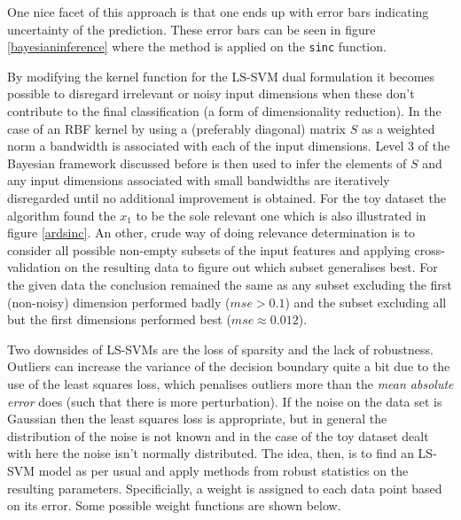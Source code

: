 One nice facet of this approach is that one ends up with error bars indicating uncertainty of the prediction. These error bars can be seen in figure \ref{bayesianinference} where the method is applied on the \texttt{sinc} function.


By modifying the kernel function for the LS-SVM dual formulation it becomes possible to disregard irrelevant or noisy input dimensions when these don't contribute to the final classification (a form of dimensionality reduction). In the case of an RBF kernel by using a (preferably diagonal) matrix $S$ as a weighted norm a bandwidth is associated with each of the input dimensions. Level 3 of the Bayesian framework discussed before is then used to infer the elements of $S$ and any input dimensions associated with small bandwidths are iteratively disregarded until no additional improvement is obtained. For the toy dataset the algorithm found the $x_1$ to be the sole relevant one which is also illustrated in figure \ref{ardsinc}. An other, crude way of doing relevance determination is to consider all possible non-empty subsets of the input features and applying cross-validation on the resulting data to figure out which subset generalises best. For the given data the conclusion remained the same as any subset excluding the first (non-noisy) dimension performed badly ($mse>0.1$) and the subset excluding all but the first dimensions performed best ($mse\approx 0.012$).


Two downsides of LS-SVMs are the loss of sparsity and the lack of robustness. Outliers can increase the variance of the decision boundary quite a bit due to the use of the least squares loss, which penalises outliers more than the \textit{mean absolute error} does (such that there is more perturbation). If the noise on the data set is Gaussian then the least squares loss is appropriate, but in general the distribution of the noise is not known and in the case of the toy dataset dealt with here the noise isn't normally distributed. The idea, then, is to find an LS-SVM model as per usual and apply methods from robust statistics on the resulting parameters. Specificially, a weight is assigned to each data point based on its error. Some possible weight functions are shown below. 

